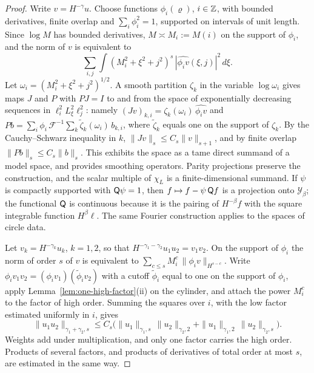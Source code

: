 \begin{proof}
Write $v=H^{-\gamma}u$. Choose functions $\phi_i(\varrho)$, $i\in\mathbb Z$,
with bounded derivatives, finite overlap and $\sum_i\phi_i^2=1$,
supported on intervals of unit length. Since $\log M$ has bounded
derivatives, $M\asymp M_i:=M(i)$ on the support of $\phi_i$, and the
norm of $v$ is equivalent to
\[
 \sum_{i,j}\int(M_i^2+\xi^2+j^2)^s\,
                    |\widehat{\phi_iv}(\xi,j)|^2\,d\xi .
\]
Let $\omega_i=(M_i^2+\xi^2+j^2)^{1/2}$. A smooth partition
$\zeta_k$ in the variable $\log\omega_i$ gives maps $J$ and $P$ with
$PJ=I$ to and from the space of exponentially decreasing sequences in
$\ell^2_iL^2_\xi\ell^2_j$: namely
$(Jv)_{k,i}=\zeta_k(\omega_i)\,\widehat{\phi_iv}$ and
$Pb=\sum_i\phi_i\,\mathcal F^{-1}\sum_k\widetilde\zeta_k(\omega_i)\,b_{k,i}$,
where $\widetilde\zeta_k$ equals one on the support of $\zeta_k$. By
the Cauchy--Schwarz inequality in $k$,
$\|Jv\|_s\le C_s\|v\|_{s+1}$, and by finite overlap
$\|Pb\|_s\le C_s\|b\|_s$. This exhibits the space as a tame direct
summand of a model space, and provides smoothing operators. Parity
projections preserve the construction, and the scalar multiple of
$\chi_L$ is a finite-dimensional summand. If $\psi$ is compactly
supported with $\mathsf Q\psi=1$, then $f\mapsto f-\psi\,\mathsf Q f$ is a
projection onto $\mathcal Y_\beta$; the functional $\mathsf Q$ is
continuous because it is the pairing of $H^{-\beta}f$ with the square
integrable function $H^\beta\ell$. The same Fourier construction
applies to the spaces of circle data.

Let $v_k=H^{-\gamma_k}u_k$, $k=1,2$, so that
$H^{-\gamma_1-\gamma_2}u_1u_2=v_1v_2$. On the support of $\phi_i$ the
norm of order $s$ of $v$ is equivalent to
$\sum_{c\le s}M_i^c\,\|\phi_iv\|_{H^{s-c}}$. Write
$\phi_iv_1v_2=(\phi_iv_1)(\widetilde\phi_iv_2)$ with a cutoff
$\widetilde\phi_i$ equal to one on the support of $\phi_i$, apply
Lemma~\ref{lem:one-high-factor}(ii) on the cylinder, and attach the
power $M_i^c$ to the factor of high order. Summing the squares over
$i$, with the low factor estimated uniformly in $i$, gives
\begin{equation}\label{eq:weighted-product}
 \|u_1u_2\|_{\gamma_1+\gamma_2,s}
 \le C_s\bigl(\|u_1\|_{\gamma_1,s}\,\|u_2\|_{\gamma_2,2}
 +\|u_1\|_{\gamma_1,2}\,\|u_2\|_{\gamma_2,s}\bigr) .
\end{equation}
Weights add under multiplication, and only one factor carries the
high order. Products of several factors, and products of derivatives
of total order at most $s$, are estimated in the same way.


\end{proof}
